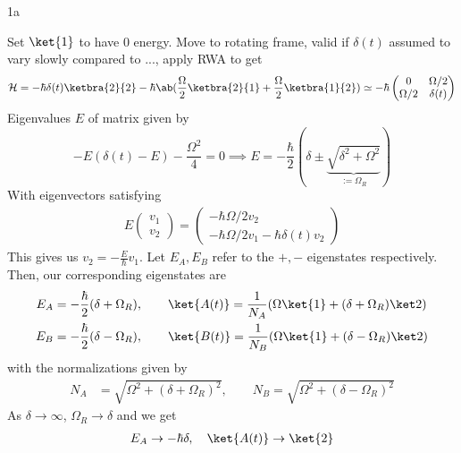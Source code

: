 \documentclass[12pt]{article}
\begin{document}
\begin{exc}{1a}
\end{exc}
\begin{ans}
    Set $\ket{1}$ to have 0 energy. Move to rotating frame, valid if $\delta(t)$ assumed to vary slowly compared to ..., apply RWA to get 
    \[\HH = -\hbar \delta(t) \ketbra{2}{2} - \hbar\ab(\frac \Omega 2 \ketbra{2}{1} + \frac{\Omega}{2} \ketbra{1}{2}) \simeq -\hbar \begin{pmatrix}
        0 & \Omega /2\\
        \Omega/2 & \delta(t)
    \end{pmatrix}\]
    Eigenvalues $E$ of matrix given by 
    \[-E(\delta(t) - E) - \frac{\Omega^2}{4} = 0 \implies E= -\frac \hbar 2 (\delta \pm \underbrace{\sqrt{\delta^2 + \Omega^2}}_{:= \Omega_R})\]
    With eigenvectors satisfying
    \begin{align*}
        E\begin{pmatrix}
          v_1 \\ v_2  
        \end{pmatrix} = \begin{pmatrix}
            -\hbar \Omega/2 v_2 \\ 
            -\hbar \Omega/2 v_1 - \hbar \delta(t) v_2
        \end{pmatrix}
    \end{align*}
    This gives us $v_2 = - \frac{E}{\hbar}v_1$.
    Let $E_{A}, E_B$ refer to the $+, -$ eigenstates respectively. Then, our corresponding eigenstates are 
    \begin{align*}
        E_A &= -\frac \hbar 2 (\delta + \Omega_R), \qquad \ket{A(t)} = \frac1{N_A}(\Omega \ket{1} + (\delta + \Omega_R)\ket 2) \\
        E_B &= -\frac \hbar 2 (\delta - \Omega_R), \qquad \ket{B(t)} = \frac1{N_B}(\Omega\ket{1} + (\delta - \Omega_R)\ket2)
    \end{align*}
    with the normalizations given by 
    \begin{align*}
        N_A &= \sqrt{\Omega^2 + (\delta + \Omega_R)^2}, \qquad N_B = \sqrt{\Omega^2 + (\delta - \Omega_R)^2} 
    \end{align*}
    As $\delta \to \infty$, $\Omega_R \to \delta$ and we get 
    \begin{align*}
        E_A \to -\hbar \delta, \quad \ket{A(t)} \to \ket{2}        \\

\end{align*}
\end{ans}
\end{document}
